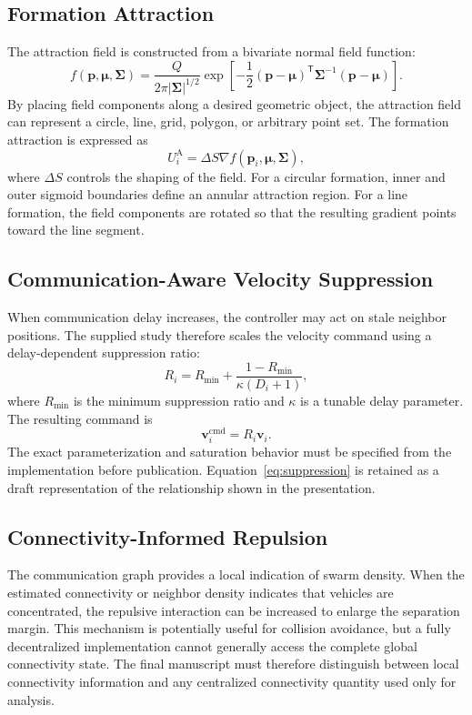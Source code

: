 \documentclass[journal]{IEEEtran}
\newcommand{\bp}{\bm{p}}
\newcommand{\bv}{\bm{v}}
\newcommand{\abs}[1]{\left\lvert#1\right\rvert}
\newcommand{\bmu}{\bm{\mu}}
\newcommand{\bSigma}{\bm{\Sigma}}
\begin{document}
\subsection{Formation Attraction}
The attraction field is constructed from a bivariate normal field function:
\begin{equation}
 f(\bp,\bmu,\bSigma) = \frac{Q}{2\pi\abs{\bSigma}^{1/2}}
 \exp\left[-\frac{1}{2}(\bp-\bmu)^{\mathsf{T}}\bSigma^{-1}(\bp-\bmu)\right].
 \label{eq:normal_field}
\end{equation}
By placing field components along a desired geometric object, the attraction field can represent a circle, line, grid, polygon, or arbitrary point set. The formation attraction is expressed as
\begin{equation}
    U_i^{\mathrm{A}} = \Delta S\nabla f(\bp_i,\bmu,\bSigma),
    \label{eq:formation_attraction}
\end{equation}
where $\Delta S$ controls the shaping of the field. For a circular formation, inner and outer sigmoid boundaries define an annular attraction region. For a line formation, the field components are rotated so that the resulting gradient points toward the line segment.

\subsection{Communication-Aware Velocity Suppression}
When communication delay increases, the controller may act on stale neighbor positions. The supplied study therefore scales the velocity command using a delay-dependent suppression ratio:
\begin{equation}
    R_i = R_{\min} + \frac{1-R_{\min}}{\kappa(D_i+1)},
    \label{eq:suppression}
\end{equation}
where $R_{\min}$ is the minimum suppression ratio and $\kappa$ is a tunable delay parameter. The resulting command is
\begin{equation}
    \bv_i^{\mathrm{cmd}} = R_i\bv_i.
    \label{eq:scaled_velocity}
\end{equation}
The exact parameterization and saturation behavior must be specified from the implementation before publication. Equation~\eqref{eq:suppression} is retained as a draft representation of the relationship shown in the presentation.

\subsection{Connectivity-Informed Repulsion}
The communication graph provides a local indication of swarm density. When the estimated connectivity or neighbor density indicates that vehicles are concentrated, the repulsive interaction can be increased to enlarge the separation margin. This mechanism is potentially useful for collision avoidance, but a fully decentralized implementation cannot generally access the complete global connectivity state. The final manuscript must therefore distinguish between local connectivity information and any centralized connectivity quantity used only for analysis.
\end{document}
